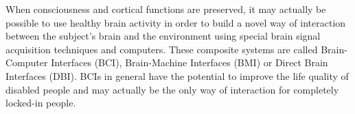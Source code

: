 \documentclass[12pt]{article}
\numberwithin{equation}{section}
\numberwithin{figure}{section}
\numberwithin{table}{section}
\begin{document}
\par{
    When consciousness and cortical functions are preserved, it may actually be
    possible to use healthy brain activity in order to build a novel way of interaction
    between the subject's brain and the environment using special brain signal
    acquisition techniques and computers. These composite systems are called
    Brain-Computer Interfaces (BCI), Brain-Machine Interfaces (BMI) or Direct Brain Interfaces (DBI).
    BCIs in general have the potential to improve the life quality of disabled people and may actually
    be the only way of interaction for completely locked-in people.
}
\end{document}
